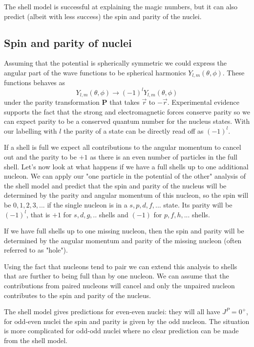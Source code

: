 \documentclass[12pt]{article}
\begin{document}
The shell model is successful at explaining the magic numbers, but it can also predict (albeit with less success) the spin and parity of the nuclei. 

\subsection{Spin and parity of nuclei}

Assuming that the potential is spherically symmetric we could express the angular part of the wave functions to be spherical harmonics $Y_{l,m}(\theta,\phi)$. These functions behaves as
\[Y_{l,m}(\theta,\phi)\rightarrow (-1)^l Y_{l,m}(\theta,\phi)\]
under the parity transformation $\mathbf{P}$ that takes $\vec{r}$ to $-\vec{r}$. Experimental evidence supports the fact that the strong and electromagnetic forces conserve parity so we can expect parity to be a conserved quantum number for the nucleus states. With our labelling with $l$ the parity of a state can be directly read off as $(-1)^l$.

If a shell is full we expect all contributions to the angular momentum to cancel out and the parity to be $+1$ as there is an even number of particles in the full shell. Let's now look at what happens if we have a full shells up to one additional nucleon. We can apply our "one particle in the potential of the other" analysis of the shell model and predict that the spin and parity of the nucleus will be determined by the parity and angular momentum of this nucleon, so the spin will be $0,1,2,3,...$ if the single nucleon is in a $s,p,d,f,...$ state. Its parity will be $(-1)^l$, that is $+1$ for $s,d,g,..$ shells and $(-1)$ for $p,f,h,...$ shells. 

If we have full shells up to one missing nucleon, then the spin and parity will be determined by the angular momentum and parity of the missing nucleon (often referred to as "hole").

Using the fact that nucleons tend to pair we can extend this analysis to shells that are further to being full than by one nucleon. We can assume that the contributions from paired nucleons will cancel and only the unpaired nucleon contributes to the spin and parity of the nucleus. 

The shell model gives predictions for even-even nuclei: they will all have $J^P=0^+$, for odd-even nuclei the spin and parity is given by the odd nucleon. The situation is more complicated for odd-odd nuclei where no clear prediction can be made from the shell model.  
\end{document}
